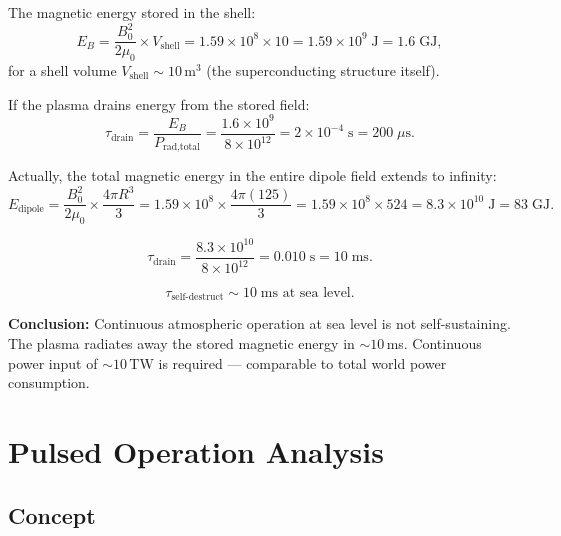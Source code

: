 \documentclass[12pt,a4paper]{article}
\begin{document}
The magnetic energy stored in the shell:
\begin{equation}
  E_B = \frac{B_0^2}{2\mu_0} \times V_{\text{shell}}
    = 1.59\times10^8 \times 10
    = 1.59 \times 10^9 \; \text{J}
    = 1.6 \; \text{GJ},
\end{equation}
for a shell volume $V_{\text{shell}} \sim 10$\,m$^3$ (the superconducting structure
itself).

If the plasma drains energy from the stored field:
\begin{equation}
  \tau_{\text{drain}} = \frac{E_B}{P_{\text{rad,total}}}
    = \frac{1.6\times10^9}{8\times10^{12}}
    = 2 \times 10^{-4} \; \text{s}
    = 200 \; \mu\text{s}.
\end{equation}

Actually, the total magnetic energy in the entire dipole field extends to infinity:
\begin{equation}
  E_{\text{dipole}} = \frac{B_0^2}{2\mu_0} \times \frac{4\pi R^3}{3}
    = 1.59\times10^8 \times \frac{4\pi (125)}{3}
    = 1.59\times10^8 \times 524
    = 8.3 \times 10^{10} \; \text{J}
    = 83 \; \text{GJ}.
\end{equation}

\begin{equation}
  \tau_{\text{drain}} = \frac{8.3\times10^{10}}{8\times10^{12}} = 0.010 \; \text{s} = 10 \; \text{ms}.
\end{equation}

\begin{equation}
  \boxed{\tau_{\text{self-destruct}} \sim 10 \; \text{ms at sea level.}}
\end{equation}

\textbf{Conclusion:} Continuous atmospheric operation at sea level is not self-sustaining.
The plasma radiates away the stored magnetic energy in $\sim 10$\,ms.  Continuous power
input of $\sim 10$\,TW is required --- comparable to total world power consumption.

\section{Pulsed Operation Analysis}
\label{sec:pulsed}

\subsection{Concept}
\end{document}
